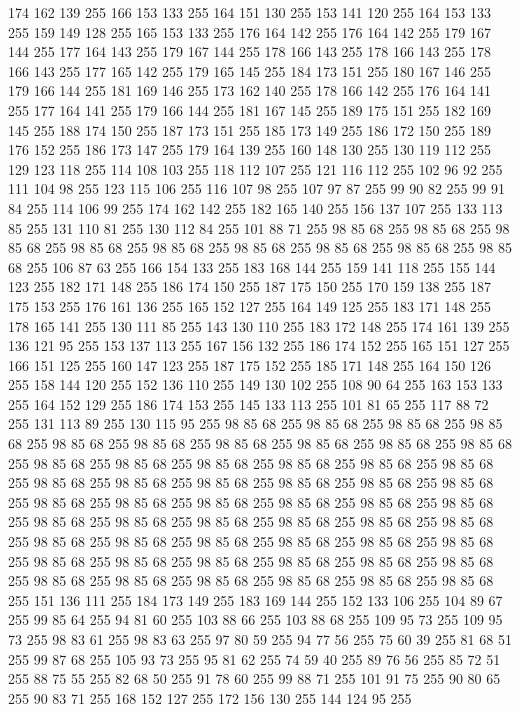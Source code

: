 174 162 139 255 166 153 133 255 164 151 130 255 153 141 120 255 164 153 133 255 159 149 128 255 165 153 133 255 176 164 142 255 176 164 142 255 179 167 144 255 177 164 143 255 179 167 144 255 178 166 143 255 178 166 143 255 178 166 143 255 177 165 142 255 179 165 145 255 184 173 151 255 180 167 146 255 179 166 144 255 181 169 146 255 173 162 140 255 178 166 142 255 176 164 141 255 177 164 141 255 179 166 144 255 181 167 145 255 189 175 151 255 182 169 145 255 188 174 150 255 187 173 151 255 185 173 149 255 186 172 150 255 189 176 152 255 186 173 147 255 179 164 139 255 160 148 130 255 130 119 112 255 129 123 118 255 114 108 103 255 118 112 107 255 121 116 112 255 102 96 92 255 111 104 98 255 123 115 106 255 116 107 98 255 107 97 87 255 99 90 82 255 99 91 84 255 114 106 99 255 174 162 142 255 182 165 140 255 156 137 107 255 133 113 85 255 131 110 81 255 130 112 84 255 101 88 71 255 98 85 68 255 98 85 68 255 98 85 68 255 98 85 68 255 98 85 68 255 98 85 68 255 98 85 68 255
98 85 68 255 98 85 68 255 106 87 63 255 166 154 133 255 183 168 144 255 159 141 118 255 155 144 123 255 182 171 148 255 186 174 150 255 187 175 150 255 170 159 138 255 187 175 153 255 176 161 136 255 165 152 127 255 164 149 125 255 183 171 148 255 178 165 141 255 130 111 85 255 143 130 110 255 183 172 148 255 174 161 139 255 136 121 95 255 153 137 113 255 167 156 132 255 186 174 152 255 165 151 127 255 166 151 125 255 160 147 123 255 187 175 152 255 185 171 148 255 164 150 126 255 158 144 120 255 152 136 110 255 149 130 102 255 108 90 64 255 163 153 133 255 164 152 129 255 186 174 153 255 145 133 113 255 101 81 65 255 117 88 72 255 131 113 89 255 130 115 95 255 98 85 68 255 98 85 68 255 98 85 68 255 98 85 68 255 98 85 68 255 98 85 68 255 98 85 68 255 98 85 68 255 98 85 68 255 98 85 68 255 98 85 68 255 98 85 68 255 98 85 68 255 98 85 68 255 98 85 68 255 98 85 68 255 98 85 68 255 98 85 68 255 98 85 68 255 98 85 68 255 98 85 68 255
98 85 68 255 98 85 68 255 98 85 68 255 98 85 68 255 98 85 68 255 98 85 68 255 98 85 68 255 98 85 68 255 98 85 68 255 98 85 68 255 98 85 68 255 98 85 68 255 98 85 68 255 98 85 68 255 98 85 68 255 98 85 68 255 98 85 68 255 98 85 68 255 98 85 68 255 98 85 68 255 98 85 68 255 98 85 68 255 98 85 68 255 98 85 68 255 98 85 68 255 98 85 68 255 98 85 68 255 98 85 68 255 98 85 68 255 98 85 68 255 98 85 68 255 151 136 111 255 184 173 149 255 183 169 144 255 152 133 106 255 104 89 67 255 99 85 64 255 94 81 60 255 103 88 66 255 103 88 68 255 109 95 73 255 109 95 73 255 98 83 61 255 98 83 63 255 97 80 59 255 94 77 56 255 75 60 39 255 81 68 51 255 99 87 68 255 105 93 73 255 95 81 62 255 74 59 40 255 89 76 56 255 85 72 51 255 88 75 55 255 82 68 50 255 91 78 60 255 99 88 71 255 101 91 75 255 90 80 65 255 90 83 71 255 168 152 127 255 172 156 130 255 144 124 95 255
